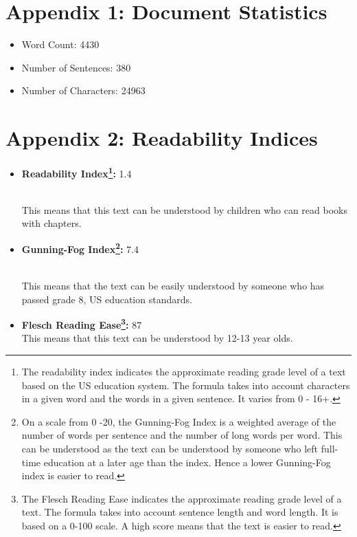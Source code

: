 \documentclass{article}
\begin{document}
\section*{}
\printglossary[type=\acronymtype]

\clearpage

\clearpage

\begin{appendix}
\section{Appendix 1: Document Statistics}

\begin{itemize}
\item Word Count: 4430
\item Number of Sentences: 380
\item Number of Characters: 24963
\end{itemize}

\section{Appendix 2: Readability Indices}

\begin{itemize}
\item \textbf{Readability Index\footnote{The readability index indicates the approximate reading grade level of a text based on the US education system. The formula takes into account characters in a given word and the words in a given sentence. It varies from 0 - 16+.}:} 1.4

\\This means that this text can be understood by children who can read books with chapters.

\item \textbf{Gunning-Fog Index\footnote{On a scale from 0 -20, the Gunning-Fog Index is a weighted average of the number of words per sentence and the number of long words per word. This can be understood as the text can be understood by someone who left full-time education at a later age than the index. Hence a lower Gunning-Fog index is easier to read.}:} 7.4

\\This means that the text can be easily understood by someone who has passed grade 8, US education standards.

\item \textbf{Flesch Reading Ease\footnote{The Flesch Reading Ease indicates the approximate reading grade level of a text. The formula takes into account sentence length and word length. It is based on a 0-100 scale. A high score means that the text is easier to read.}:} 87 \\This means that this text can be understood by 12-13 year olds.


\end{itemize}
\end{appendix}
\end{document}

